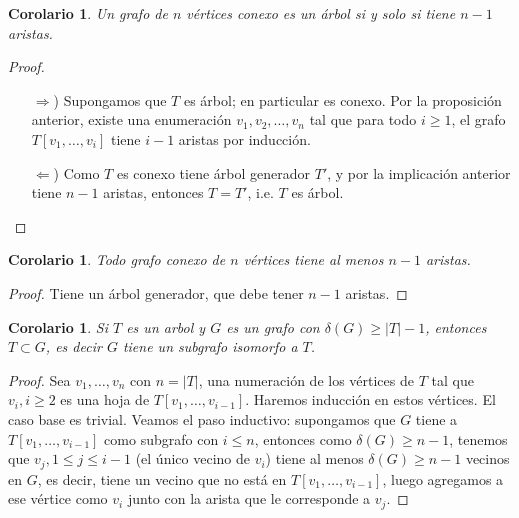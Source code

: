 \documentclass[12pt]{report}
\theoremstyle{plain}
\newtheorem{corollary}[theorem]{Corolario}
\theoremstyle{definition}
\newcommand{\abs}[1]{\left \vert #1 \right \vert}
\begin{document}


\begin{corollary}
Un grafo de $n$ vértices conexo es un árbol si y solo si tiene $n-1$ aristas.
\end{corollary}
\begin{proof}
\begin{enumerate}
\item[$\Rightarrow$)] Supongamos que $T$ es árbol; en particular es conexo. Por la proposición anterior, existe una enumeración $v_1,v_2,\ldots,v_n$ tal que para todo $i \geq 1$, el grafo $T[v_1,\ldots, v_i]$ tiene $i-1$ aristas por inducción.

\item[$\Leftarrow$)] Como $T$ es conexo tiene árbol generador $T'$, y por la implicación anterior tiene $n-1$ aristas, entonces $T = T'$, i.e. $T$ es árbol.
\end{enumerate}
\end{proof}

\begin{corollary}
Todo grafo conexo de $n$ vértices tiene al menos $n-1$ aristas.
\end{corollary}
\begin{proof}
Tiene un árbol generador, que debe tener $n-1$ aristas.
\end{proof}

\begin{corollary}
Si $T$ es un arbol y $G$ es un grafo con $\delta (G) \geq \abs T -1$, entonces $T \subset G$, es decir $G$ tiene un subgrafo isomorfo a $T$.
\end{corollary}
\begin{proof}
Sea $v_1,\ldots,v_n$ con $n = \abs T$, una numeración de los vértices de $T$ tal que $v_i, i \geq 2$ es una hoja de $T[v_1,\ldots,v_{i-1}]$. Haremos inducción en estos vértices. El caso base es trivial. Veamos el paso inductivo: supongamos que $G$ tiene a $T[v_1,\ldots,v_{i-1}]$ como subgrafo con $i\leq n$, entonces como $\delta (G) \geq n-1$, tenemos que $v_j, 1 \leq j \leq i-1$ (el único vecino de $v_i$) tiene al menos $\delta(G) \geq n-1$ vecinos en $G$, es decir, tiene un vecino que no está en $T[v_1,\ldots, v_{i-1}]$, luego agregamos a ese vértice como $v_i$ junto con la arista que le corresponde a $v_j$.
\end{proof}

\bigskip
\end{document}
